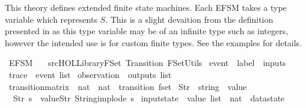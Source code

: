 %
\begin{isabellebody}%
%
%
\isadelimdocument
%
\endisadelimdocument
%
\isatagdocument
%
\isamarkuptrue%
%
\endisatagdocument
{\isafolddocument}%
%
\isadelimdocument
%
\endisadelimdocument
%
\begin{isamarkuptext}%
This theory defines extended finite state machines. Each EFSM takes a type variable which represents
$S$. This is a slight devaition from the definition presented in \cite{foster2018} as this
type variable may be of an infinite type such as integers, however the intended use is for custom
finite types. See the examples for details.%
\end{isamarkuptext}\isamarkuptrue%
%
\isadelimtheory
%
\endisadelimtheory
%
\isatagtheory
{}\isamarkupfalse%
\ EFSM\isanewline
\ \ \ {\isachardoublequoteopen}{\isachartilde}{\isachartilde}{\isacharslash}src{\isacharslash}HOL{\isacharslash}Library{\isacharslash}FSet{\isachardoublequoteclose}\ Transition\ FSet{\isacharunderscore}Utils\isanewline
{}%
\endisatagtheory
{\isafoldtheory}%
%
\isadelimtheory
%
\endisadelimtheory
\isanewline
\isanewline
{}\isamarkupfalse%
\ event\ {\isacharequal}\ {\isachardoublequoteopen}{\isacharparenleft}label\ {\isasymtimes}\ inputs{\isacharparenright}{\isachardoublequoteclose}\isanewline
{}\isamarkupfalse%
\ trace\ {\isacharequal}\ {\isachardoublequoteopen}event\ list{\isachardoublequoteclose}\isanewline
{}\isamarkupfalse%
\ observation\ {\isacharequal}\ {\isachardoublequoteopen}outputs\ list{\isachardoublequoteclose}\isanewline
{}\isamarkupfalse%
\ transition{\isacharunderscore}matrix\ {\isacharequal}\ {\isachardoublequoteopen}{\isacharparenleft}{\isacharparenleft}nat\ {\isasymtimes}\ nat{\isacharparenright}\ {\isasymtimes}\ transition{\isacharparenright}\ fset{\isachardoublequoteclose}\isanewline
\isanewline
{}\isamarkupfalse%
\ Str\ {\isacharcolon}{\isacharcolon}\ {\isachardoublequoteopen}string\ {\isasymRightarrow}\ value{\isachardoublequoteclose}\ \isanewline
\ \ {\isachardoublequoteopen}Str\ s\ {\isasymequiv}\ value{\isachardot}Str\ {\isacharparenleft}String{\isachardot}implode\ s{\isacharparenright}{\isachardoublequoteclose}\isanewline
\isanewline
{}\isamarkupfalse%
\ input{}state\ {\isacharcolon}{\isacharcolon}\ {\isachardoublequoteopen}value\ list\ {\isasymRightarrow}\ nat\ {\isasymRightarrow}\ datastate{\isachardoublequoteclose}\ \isanewline

\end{isabellebody}
